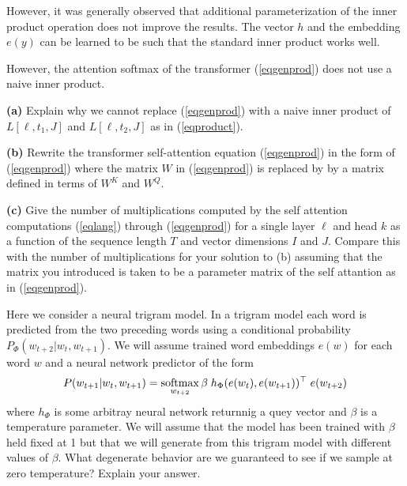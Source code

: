 \documentclass{article}
\newcommand{\solution}[1]{}
\begin{document}
However, it was generally observed that additional parameterization of the inner product operation does not improve the results.  The vector $h$ and the embedding $e(y)$
can be learned to be such that the standard inner product works well.

However, the attention softmax of the transformer (\ref{eqgenprod}) does not use a naive inner product.

\medskip
    {\bf (a)} Explain why we cannot replace (\ref{eqgenprod}) with a naive inner product of $L[\ell,t_1,J]$ and $L[\ell,t_2,J]$ as in (\ref{eqproduct}).

    \solution{The attention $\alpha[\ell,k,t_1,t_2]$ need to depend on the particular head $k$.  Different heads compute different information.}
    
\medskip
{\bf (b)} Rewrite the transformer self-attention equation (\ref{eqgenprod}) in the form of (\ref{eqgenprod}) where
the matrix $W$ in (\ref{eqgenprod}) is replaced by by a matrix defined in terms of $W^K$ and $W^Q$.

\solution{
  \begin{eqnarray*}
    \alpha[\ell,k,t_1,t_2] & = & \softmax_{t_2}\; \frac{1}{\sqrt{I}}\;L[\ell,t_1,J]\;W^{QK}[\ell,k,J,J']\;L[\ell,t2,J'] \\
    \\
    w^{QK}[\ell,k,j_1,j_2] & = & W^Q[\ell,k,I,j_1]W^K[\ell,k,I,j_2]
  \end{eqnarray*}
}

\medskip
{\bf (c)} Give the number of multiplications computed by the self attention computations (\ref{eqlang}) through (\ref{eqgenprod}) for a single layer $\ell$  and head $k$ as a function of the sequence
length $T$ and vector dimensions $I$ and $J$.  Compare this with the number of multiplications for your solution to (b) assuming that the matrix you introduced is taken to be a parameter matrix of the self attantion as in
(\ref{eqgenprod}).



\solution{
  For equations (\ref{eqgenproda}) through (\ref{eqgenprod}) we get $2TIJ + T^2I^2$.  For the solution to (a) we get $T^2J^2$.  Since we typically have $I << J$ the solution to (a) is much less efficient.
}


  Here we consider a neural trigram model.  In a trigram model each word is predicted from the two preceding words using a conditional probability $P_\Phi(w_{t+2}|w_t,w_{t+1})$.
We will assume trained word embeddings $e(w)$ for each word $w$ and a neural network predictor of the form
$$P(w_{t+1}|w_t,w_{t+1}) = \operatorname*{softmax}_{w_{t+2}} \beta \; h_\Phi(e(w_t),e(w_{t+1}))^\top\;e(w_{t+2})$$
where $h_\Phi$ is some arbitray neural network returnnig a quey vector and $\beta$ is a temperature parameter.
We will assume that the model has been trained with $\beta$ held fixed at 1 but that we will generate from this trigram model with different values of $\beta$.
What degenerate behavior are we guaranteed to see if we sample at zero temperature?  Explain your answer.
\end{document}
